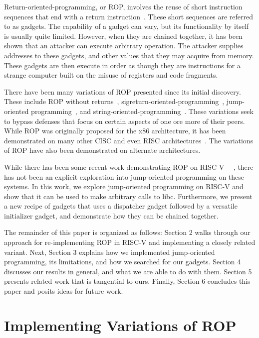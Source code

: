 Return-oriented-programming, or ROP, involves the reuse of short instruction
sequences that end with a return instruction~\cite{shacham07ropx86}. These short sequences are referred
to as gadgets. The capability of a gadget can vary, but its functionality by
itself is usually quite limited. However, when they are chained together, it has
been shown that an attacker can execute arbitrary operation. The attacker
supplies addresses to these gadgets, and other values that they may acquire from
memory. These gadgets are then execute in order as though they are instructions
for a strange computer built on the misuse of registers and code fragments.

There have been many variations of ROP presented since its initial discovery.
These include ROP without returns~\cite{checkoway10ropnoret},
sigreturn-oriented-programming~\cite{bosman14sigrop},
jump-oriented programming~\cite{bletsch11jopx86}, and string-oriented-programming~\cite{payer13sop}. These variations
seek to bypass defenses that focus on certain aspects of one ore more of their
peers. While ROP was originally proposed for the x86 architecture, it has been
demonstrated on many other CISC and even RISC architectures~\cite{buchanan08roprisc,kornau10roparm}. The variations of
ROP have also been demonstrated on alternate architectures.

While there has been some recent work demonstrating ROP on RISC-V~%
~\cite{gu20ropriscv,jaloyan20ropriscv}, there has not been an explicit
exploration into jump-oriented programming on these systems. In this work, we
explore jump-oriented programming on RISC-V and show that it can be used to make
arbitrary calls to libc. Furthermore, we present a new recipe of gadgets that
uses a dispatcher gadget followed by a versatile initializer gadget, and
demonstrate how they can be chained together.

The remainder of this paper is organized as follows: Section 2 walks through our
approach for re-implementing ROP in RISC-V and implementing a closely related
variant. Next, Section 3 explains how we implemented jump-oriented programming,
its limitations, and how we searched for our gadgets. Section 4 discusses our
results in general, and what we are able to do with them. Section 5 presents
related work that is tangential to ours. Finally, Section 6 concludes this paper
and posits ideas for future work.

\section{Implementing Variations of ROP}

